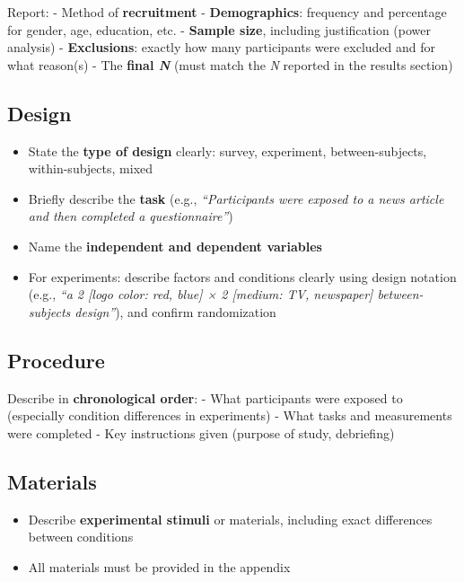 \documentclass[
  11pt,
  a4paper,
]{scrbook}
\providecommand{\tightlist}{%
  \setlength{\itemsep}{0pt}\setlength{\parskip}{0pt}}\usepackage{longtable,booktabs,array}
\begin{document}
Report: - Method of \textbf{recruitment} - \textbf{Demographics}:
frequency and percentage for gender, age, education, etc. -
\textbf{Sample size}, including justification (power analysis) -
\textbf{Exclusions}: exactly how many participants were excluded and for
what reason(s) - The \textbf{final \emph{N}} (must match the \emph{N}
reported in the results section)

\subsection{Design}\label{design-1}

\begin{itemize}
\tightlist
\item
  State the \textbf{type of design} clearly: survey, experiment,
  between-subjects, within-subjects, mixed
\item
  Briefly describe the \textbf{task} (e.g., \emph{``Participants were
  exposed to a news article and then completed a questionnaire''})
\item
  Name the \textbf{independent and dependent variables}
\item
  For experiments: describe factors and conditions clearly using design
  notation (e.g., \emph{``a 2 {[}logo color: red, blue{]} × 2 {[}medium:
  TV, newspaper{]} between-subjects design''}), and confirm
  randomization
\end{itemize}

\subsection{Procedure}\label{procedure-1}

Describe in \textbf{chronological order}: - What participants were
exposed to (especially condition differences in experiments) - What
tasks and measurements were completed - Key instructions given (purpose
of study, debriefing)

\subsection{Materials}\label{materials}

\begin{itemize}
\tightlist
\item
  Describe \textbf{experimental stimuli} or materials, including exact
  differences between conditions
\item
  All materials must be provided in the appendix
\end{itemize}
\end{document}
